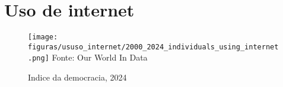 \section{Uso de internet}

\begin{figure}[ht]
    \centering
    \caption{Indice da democracia, 2024}
    \texttt{[image: figuras/ususo\_internet/2000\_2024\_individuals\_using\_internet.png]}
    \label{fig:2000_2024_individuals_using_internet}
    \footnotesize{Fonte: Our World In Data}
\end{figure}